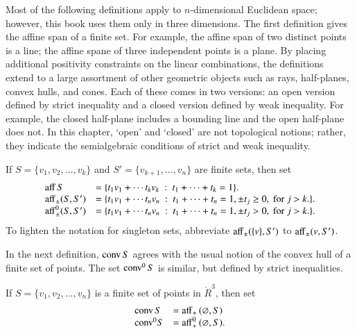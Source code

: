 Most of the following definitions apply to $n$-dimensional
Euclidean space; however, this book uses them only in
three dimensions.  The first definition 
gives the affine span of a finite set.  For example,
the affine span of two distinct points is a line;
the affine spane of three independent points is a plane.
By placing additional
positivity constraints on the linear combinations, the definitions
extend to a large assortment of other geometric objects
such as rays, half-planes, convex hulls, and cones.  
Each of these comes in two versions: an open version
defined by strict inequality and a closed version defined
by weak inequality.  For example, the closed half-plane
includes a bounding line and the open half-plane does
not.  In this chapter, `open' and `closed' are not topological notions; rather, they
indicate the semialgebraic conditions of strict  and weak inequality.


\begin{definition}[affine]\label{def:aff} 
 If $S = \{v_1,v_2,\ldots,v_k\}$ 
and $S'=\{v_{k+1},\ldots,v_n\}$ are  finite sets, then
set
	$$\begin{array}{lll}
      {\operatorname{aff}}\, S &= \{t_1 v_1 +\cdots t_k v_k \ :\ 
	t_1 +\cdots+t_k = 1\}.\\
        {\operatorname{aff}}_{\pm} (S,S') &= \{t_1 v_1 +\cdots t_n v_n \ :\ 
	t_1 +\cdots+t_n = 1, \pm t_j \ge 0, \text{ for } j>k.\}.\\
        {\operatorname{aff}}^0_{\pm} (S,S') &= \{t_1 v_1 +\cdots t_n v_n \ :\ 
	t_1 +\cdots+t_n = 1, \pm t_j > 0, \text{ for } j>k.\}.\\
		\end{array}
        $$
To lighten the notation for singleton sets, abbreviate ${\operatorname{aff}}_\pm(\{v\},S')$ to
${\operatorname{aff}}_\pm(v,S')$.
%
%
%
%
%
\end{definition}


In the next definition, ${\operatorname{conv}}\,S$ agrees with the usual
notion of the convex hull of a finite set of points.
The set ${\operatorname{conv}}^0\,S$ is similar, but defined by strict inequalities.


\begin{definition}  If $S = \{v_1,v_2,\ldots,v_n\}$ is a finite set
of points in $\ring{R}^3$, then
set
	$$
        \begin{array}{lll}
          {\operatorname{conv}}\, S &= {\operatorname{aff}}_+\, (\varnothing,S)\\
	   {\operatorname{conv}}^0 S &= {\operatorname{aff}}^0_+\, (\varnothing,S).\\
           \end{array}
        $$
%
%
%
\end{definition}

